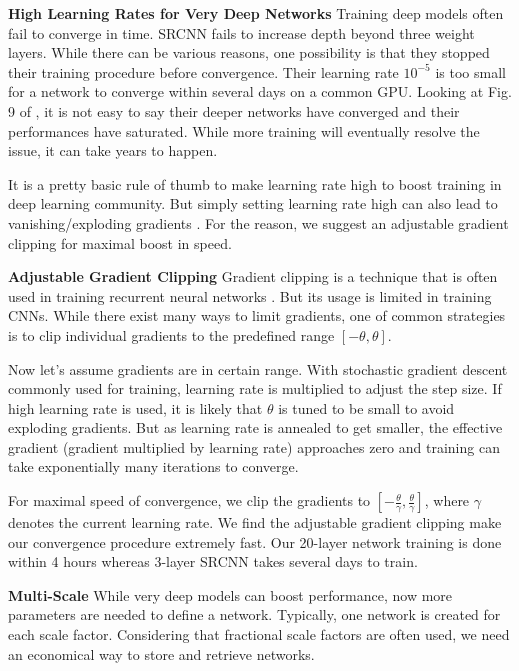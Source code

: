 \documentclass[10pt,twocolumn,letterpaper]{article}
\begin{document}
\textbf{High Learning Rates for Very Deep Networks}
Training deep models often fail to converge in time. SRCNN \cite{dong2015image} fails to increase depth beyond three weight layers. While there can be various reasons, one possibility is that they stopped their training procedure before convergence. Their learning rate $10^{-5}$ is too small for a network to converge within several days on a common GPU. Looking at Fig. 9 of \cite{dong2015image}, it is not easy to say their deeper networks have converged and their performances have saturated. While more training will eventually resolve the issue, it can take years to happen. 

It is a pretty basic rule of thumb to make learning rate high to boost training in deep learning community. But simply setting learning rate high can also lead to vanishing/exploding gradients \cite{bengio1994learning}. For the reason, we suggest an adjustable gradient clipping for maximal boost in speed.

\textbf{Adjustable Gradient Clipping}
Gradient clipping is a technique that is often used in training recurrent neural networks \cite{pascanu2013difficulty}. But its usage is limited in training CNNs. While there exist many ways to limit gradients, one of common strategies is to clip individual gradients to the predefined range 
$[-\theta, \theta]$. 

Now let's assume gradients are in certain range. With stochastic gradient descent commonly used for training, learning rate is multiplied to adjust the step size. If high learning rate is used, it is likely that $\theta$ is tuned to be small to avoid exploding gradients. But as learning rate is annealed to get smaller, the effective gradient (gradient multiplied by learning rate) approaches zero and training can take exponentially many iterations to converge.

For maximal speed of convergence, we clip the gradients to $[-\frac{\theta}{\gamma}, \frac{\theta}{\gamma}]$, where $\gamma$ denotes the current learning rate. We find the adjustable gradient clipping make our convergence procedure extremely fast. Our 20-layer network training is done within 4 hours whereas 3-layer SRCNN takes several days to train.


\textbf{Multi-Scale} While very deep models can boost performance, now more parameters are needed to define a network. Typically, one network is created for each scale factor. Considering that fractional scale factors are often used, we need an economical way to store and retrieve networks.
\end{document}
